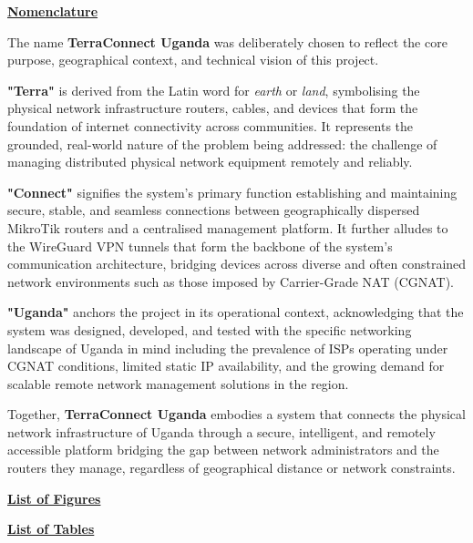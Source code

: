 \documentclass[12pt,a4paper,oneside]{report}
\begin{document}
\clearpage

\uline{\textbf{Nomenclature}}


The name \textbf{TerraConnect Uganda} was deliberately chosen to reflect the core purpose, geographical context, and technical vision of this project.


\textbf{"Terra"} is derived from the Latin word for \textit{earth} or \textit{land}, symbolising the physical network infrastructure routers, cables, and devices that form the foundation of internet connectivity across communities. It represents the grounded, real-world nature of the problem being addressed: the challenge of managing distributed physical network equipment remotely and reliably.


\textbf{"Connect"} signifies the system's primary function establishing and maintaining secure, stable, and seamless connections between geographically dispersed MikroTik routers and a centralised management platform. It further alludes to the WireGuard VPN tunnels that form the backbone of the system's communication architecture, bridging devices across diverse and often constrained network environments such as those imposed by Carrier-Grade NAT (CGNAT).


\textbf{"Uganda"} anchors the project in its operational context, acknowledging that the system was designed, developed, and tested with the specific networking landscape of Uganda in mind including the prevalence of ISPs operating under CGNAT conditions, limited static IP availability, and the growing demand for scalable remote network management solutions in the region.


Together, \textbf{TerraConnect Uganda} embodies a system that connects the physical network infrastructure of Uganda through a secure, intelligent, and remotely accessible platform bridging the gap between network administrators and the routers they manage, regardless of geographical distance or network constraints.


\clearpage





\uline{\textbf{List of Figures}}










\clearpage



\uline{\textbf{List of Tables}}
\end{document}
